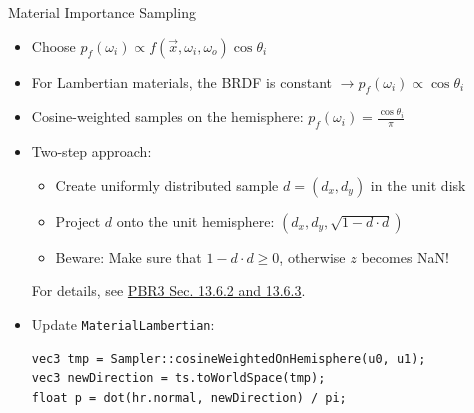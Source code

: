 \documentclass[utf8,stillsansserifmath,fleqn,t]{beamer}
\newcommand{\code}[1]{\texttt{#1}}
\begin{document}
\begin{frame}[fragile,label=material-importance-sampling-1]
\frametitle{\insertsection}
Material Importance Sampling
\begin{itemize}
\item Choose $p_f(\omega_i) \propto f(\vec{x},\omega_i,\omega_o)\cos\theta_i$
\item For Lambertian materials, the BRDF is constant $\rightarrow p_f(\omega_i) \propto \cos\theta_i$
\item Cosine-weighted samples on the hemisphere: $p_f(\omega_i) = \frac{\cos\theta_i}{\pi}$
\item Two-step approach:
    \begin{itemize}
    \item Create uniformly distributed sample $d=(d_x,d_y)$ in the unit disk
    \item Project $d$ onto the unit hemisphere: $(d_x, d_y, \sqrt{1-d\cdot d})$
    \item Beware: Make sure that $1-d\cdot d \geq 0$, otherwise $z$ becomes NaN!
    \end{itemize}
    For details, see \href{https://www.pbr-book.org/3ed-2018/Monte_Carlo_Integration/2D_Sampling_with_Multidimensional_Transformations}{PBR3 Sec. 13.6.2 and 13.6.3}.
\item Update \code{MaterialLambertian}:
\begin{lstlisting}
vec3 tmp = Sampler::cosineWeightedOnHemisphere(u0, u1);
vec3 newDirection = ts.toWorldSpace(tmp);
float p = dot(hr.normal, newDirection) / pi;
\end{lstlisting}
\end{itemize}
\end{frame}
\end{document}
